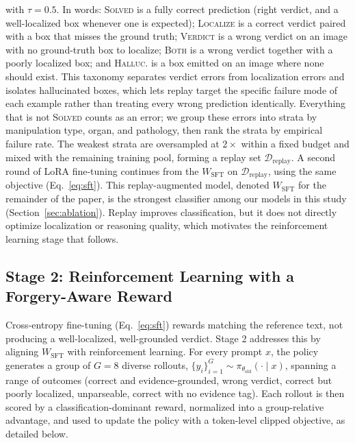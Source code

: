 \documentclass[10pt,twocolumn,letterpaper]{article}
\begin{document}
with $\tau = 0.5$. In words: \textsc{Solved} is a fully correct prediction (right verdict, and a well-localized box whenever one is expected); \textsc{Localize} is a correct verdict paired with a box that misses the ground truth; \textsc{Verdict} is a wrong verdict on an image with no ground-truth box to localize; \textsc{Both} is a wrong verdict together with a poorly localized box; and \textsc{Halluc.} is a box emitted on an image where none should exist. This taxonomy separates verdict errors from localization errors and isolates hallucinated boxes, which lets replay target the specific failure mode of each example rather than treating every wrong prediction identically. Everything that is not \textsc{Solved} counts as an error; we group these errors into strata by manipulation type, organ, and pathology, then rank the strata by empirical failure rate. The weakest strata are oversampled at $2\times$ within a fixed budget and mixed with the remaining training pool, forming a replay set $\mathcal{D}_{\mathrm{replay}}$. A second round of LoRA fine-tuning continues from the $W_{\mathrm{SFT}}$ on $\mathcal{D}_{\mathrm{replay}}$, using the same objective (Eq.~\ref{eq:sft}). This replay-augmented model, denoted $W_{\mathrm{SFT}}$ for the remainder of the paper, is the strongest classifier among our models in this study (Section~\ref{sec:ablation}). Replay improves classification, but it does not directly optimize localization or reasoning quality, which motivates the reinforcement learning stage that follows.

\subsection{Stage 2: Reinforcement Learning with a Forgery-Aware Reward}
\label{sec:stage2}
Cross-entropy fine-tuning (Eq.~\ref{eq:sft}) rewards matching the reference text, not producing a well-localized, well-grounded verdict. Stage 2 addresses this by aligning $W_{\mathrm{SFT}}$ with reinforcement learning. For every prompt $x$, the policy generates a group of $G{=}8$ diverse rollouts, $\{y_i\}_{i=1}^G \sim \pi_{\theta_{\mathrm{old}}}(\cdot\mid x)$, spanning a range of outcomes (correct and evidence-grounded, wrong verdict, correct but poorly localized, unparseable, correct with no evidence tag). Each rollout is then scored by a classification-dominant reward, normalized into a group-relative advantage, and used to update the policy with a token-level clipped objective, as detailed below.
\end{document}
